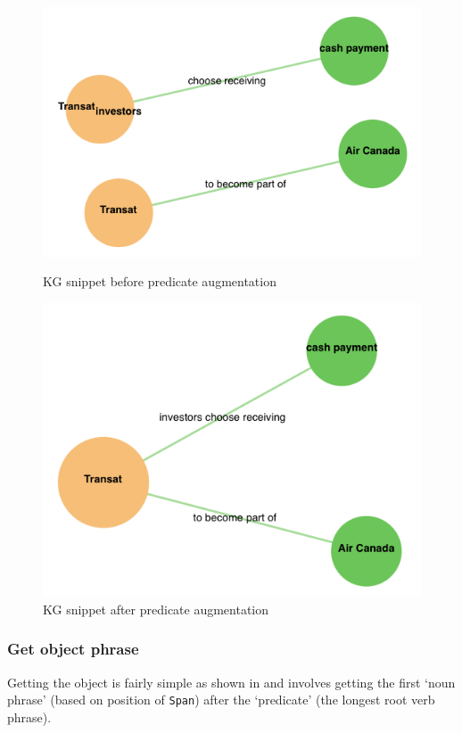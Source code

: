 \begin{figure}[H]
  \begin{minipage}{0.5\linewidth}
  \centering
  \includegraphics[width=0.8\linewidth]{images/kg_transat.png}
  \caption{KG snippet before predicate augmentation}
  \label{fig:transat_before}
  \end{minipage}
  \hfill
  \begin{minipage}{0.5\linewidth}
  \centering
  \includegraphics[width=0.8\linewidth]{images/kg_transat_correct.png}
  \caption{KG snippet after predicate augmentation}
  \label{fig:transat_after}
  \end{minipage}
\end{figure}

\vspace{-4ex}
\subsubsection{Get object phrase}
Getting the object is fairly simple as shown in  and involves getting the first `noun phrase' (based on position of \texttt{Span}) after the `predicate' (the longest root verb phrase).

